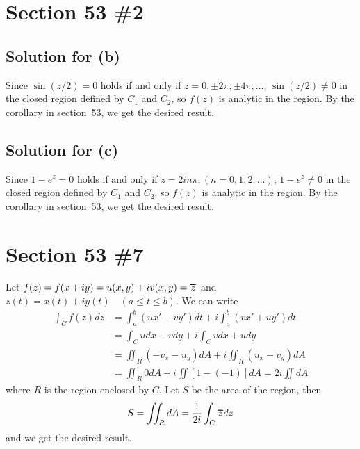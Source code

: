 \documentclass{scrartcl}
\newcommand\Overline[2][0.8pt]{%
  \begin{tikzpicture}[baseline=(a.base)]
    \node[inner xsep=0pt,inner ysep=1.5pt] (a) {$#2$};
    \draw[line width= #1] (a.north west) -- (a.north east);
  \end{tikzpicture}
}
\begin{document}
\section{Section 53 \#2}
\subsection{Solution for (b)}
Since \(\sin (z / 2) = 0\) holds if and only if \(z = 0, \pm 2\pi, \pm 4\pi, \dots\), \(\sin (z / 2) \not = 0\) in the closed region defined by \(C_1\) and \(C_2\), so \(f(z)\) is analytic in the region.
By the corollary in section~53, we get the desired result.

\subsection{Solution for (c)}
Since \(1 - e^z = 0\) holds if and only if \(z = 2in\pi, (n = 0, 1, 2, \dots)\), \(1 - e^z \not = 0\) in the closed region defined by \(C_1\) and \(C_2\), so \(f(z)\) is analytic in the region.
By the corollary in section~53, we get the desired result.

\section{Section 53 \#7}
Let \(f(z) = f(x + iy) = u(x, y) + iv(x, y) = \Overline{z}\) and \(z(t) = x(t) + iy(t) \quad (a \leq t \leq b)\).
We can write
\begin{align*}
  \int_C f(z) dz &= \int^b_a (ux' - vy') dt + i \int^b_a (vx' + uy') dt \\
                 &= \int_C u dx - v dy + i \int_C v dx + u dy \\
                 &= \iint_R (-v_x - u_y) dA + i \iint_R (u_x - v_y) dA \\
                 &= \iint_R 0 dA + i \iint [1 - (-1)] dA = 2i \iint dA
\end{align*}
where \(R\) is the region enclosed by \(C\).
Let \(S\) be the area of the region, then
\begin{align*}
  S = \iint_R dA = \frac{1}{2i} \int_C \Overline{z} dz
\end{align*}
and we get the desired result.
\end{document}
